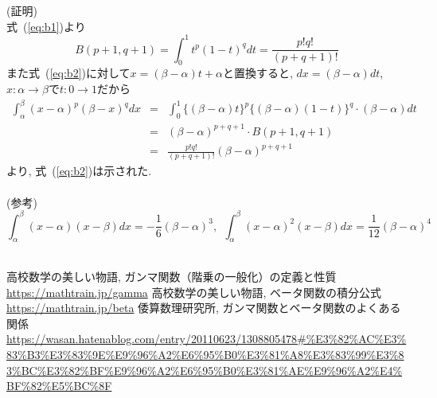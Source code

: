 \documentclass[a4paper,12pt,uplatex,dvipdfmx]{jsarticle}
\begin{document}
(証明) \\
式~(\ref{eq:b1})より
\[
    B(p+1, q+1) = \int_0^1 t^p(1-t)^q dt = \frac{p!q!}{(p+q+1)!}
\]
また式~(\ref{eq:b2})に対して$x = (\beta - \alpha)t + \alpha$と置換すると, $dx = (\beta - \alpha)dt$,~$x:\alpha \to \beta$で$t:0 \to 1$だから
\begin{eqnarray*}
    \int_{\alpha}^{\beta}(x-\alpha)^{p}(\beta-x)^{q} dx
    & = & \int_0^1 \{(\beta - \alpha)t\}^p\{(\beta - \alpha)(1-t)\}^q \cdot (\beta - \alpha)dt \\
    & = & (\beta - \alpha)^{p+q+1} \cdot B(p+1, q+1) \\
    & = & \frac{p!q!}{(p+q+1)!}(\beta-\alpha)^{p+q+1}
\end{eqnarray*}
より, 式~(\ref{eq:b2})は示された. \\\\

(参考)
\[
    \int_\alpha^\beta (x - \alpha)(x - \beta) dx = -\frac{1}{6}(\beta - \alpha)^3,~~ \int_\alpha^\beta (x - \alpha)^2(x - \beta) dx = \frac{1}{12}(\beta - \alpha)^4
\] \\



\begin{thebibliography}{9}
    高校数学の美しい物語, ガンマ関数（階乗の一般化）の定義と性質 \\
    \url{https://mathtrain.jp/gamma}
    高校数学の美しい物語, ベータ関数の積分公式 \\
    \url{https://mathtrain.jp/beta}
    倭算数理研究所, ガンマ関数とベータ関数のよくある関係 \\
    \url{https://wasan.hatenablog.com/entry/20110623/1308805478#%E3%82%AC%E3%83%B3%E3%83%9E%E9%96%A2%E6%95%B0%E3%81%A8%E3%83%99%E3%83%BC%E3%82%BF%E9%96%A2%E6%95%B0%E3%81%AE%E9%96%A2%E4%BF%82%E5%BC%8F}
\end{thebibliography}
\end{document}
